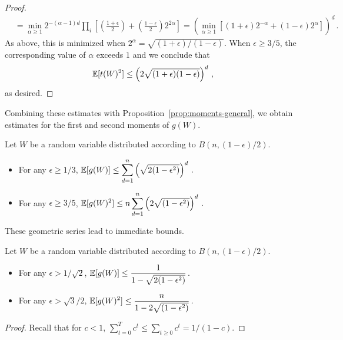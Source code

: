 \begin{proof}
\begin{align*}
    &= \min_{\alpha \geq 1} 2^{-(\alpha - 1)d} \prod_i \left[\left(\frac{1+\epsilon}{2}\right) + \left(\frac{1-\epsilon}{2}\right) 2^{2\alpha}\right] = \left(\min_{\alpha \geq 1} \left[(1+\epsilon)2^{-\alpha}  + (1-\epsilon) 2^{\alpha}\right]\right)^d\,.
\end{align*}
As above, this is minimized when $2^\alpha = \sqrt{(1 + \epsilon)/(1 - \epsilon)}$. When $\epsilon \geq 3/5$, the corresponding value of $\alpha$ exceeds $1$ and we conclude that
\[
  \operatorname{\mathbb{E}}[t(W)^2] \leq \left(2\sqrt{(1 + \epsilon)(1 - \epsilon)}\right)^d\,,
\]
as desired.
\end{proof}

Combining these estimates with Proposition~\ref{prop:moments-general}, we obtain estimates for the first and second moments of $g(W)$. 
\begin{corollary}
  Let $W$ be a random variable distributed according to $B(n,(1-\epsilon)/2)$.
  \begin{itemize}
  \item For any $\epsilon \geq 1/3$, \quad $\displaystyle \operatorname{\mathbb{E}}[g(W)] \leq \sum_{d=1}^n \left(\sqrt{2(1 - \epsilon^2)}\right)^d\,.$
  \item For any $\epsilon \geq 3/5$, \quad $\displaystyle
    \operatorname{\mathbb{E}}[g(W)^2] \leq n \sum_{d=1}^n \left(2\sqrt{(1 - \epsilon^2)}\right)^d\,.$
  \end{itemize}
\end{corollary}


These geometric series lead to immediate bounds. 

\begin{proposition}\label{prop:praos-moments-simple-large-eps} 
  Let $W$ be a random variable distributed according to $B(n,(1-\epsilon)/2)$.
    \begin{itemize}
    \item For any $\epsilon > 1/\sqrt{2}$, \quad
      $\displaystyle
        \operatorname{\mathbb{E}}[g(W)] \leq \frac{1}{1 - \sqrt{2(1 - \epsilon^2)}}\,.$
    \item For any $\epsilon > \sqrt{3}/2$, \quad $\displaystyle \operatorname{\mathbb{E}}[g(W)^2] \leq \frac{n}{1 - 2\sqrt{(1 - \epsilon^2)}}\,.$
    \end{itemize}
\end{proposition}

\begin{proof}
  Recall that for $c < 1$, $\sum_{t = 0}^T c^t \leq \sum_{t \geq 0} c^t = 1/(1 - c)$.
\end{proof}





%   



